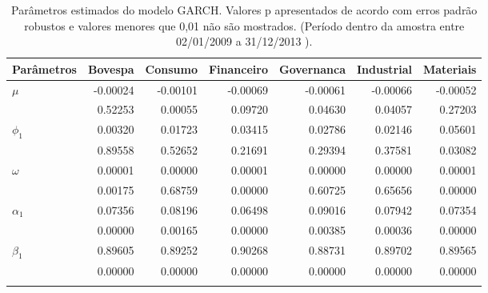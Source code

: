 \begin{longtable}{lrrrrrr}
\caption{Par\^ametros estimados do modelo GARCH. Valores p apresentados de acordo 
com erros padrão robustos e valores menores que 0,01 não são mostrados. (Período 
             dentro da amostra entre 02/01/2009 a 31/12/2013 ).} \\ 
  \toprule
Parâmetros & Bovespa & Consumo & Financeiro & Governanca & Industrial & Materiais \\ 
  \midrule
$\mu$ & -0.00024 & -0.00101 & -0.00069 & -0.00061 & -0.00066 & -0.00052 \\ 
   & 0.52253 & 0.00055 & 0.09720 & 0.04630 & 0.04057 & 0.27203 \\ 
  $\phi_1$ & 0.00320 & 0.01723 & 0.03415 & 0.02786 & 0.02146 & 0.05601 \\ 
   & 0.89558 & 0.52652 & 0.21691 & 0.29394 & 0.37581 & 0.03082 \\ 
  $\omega$ & 0.00001 & 0.00000 & 0.00001 & 0.00000 & 0.00000 & 0.00001 \\ 
   & 0.00175 & 0.68759 & 0.00000 & 0.60725 & 0.65656 & 0.00000 \\ 
  $\alpha_1$ & 0.07356 & 0.08196 & 0.06498 & 0.09016 & 0.07942 & 0.07354 \\ 
   & 0.00000 & 0.00165 & 0.00000 & 0.00385 & 0.00036 & 0.00000 \\ 
  $\beta_1$ & 0.89605 & 0.89252 & 0.90268 & 0.88731 & 0.89702 & 0.89565 \\ 
   & 0.00000 & 0.00000 & 0.00000 & 0.00000 & 0.00000 & 0.00000 \\ 
   \bottomrule
\label{tab:garchcoef}
\end{longtable}
